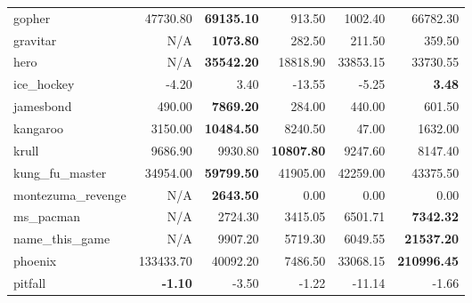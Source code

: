 \begin{center}
\begin{tabular}{l@{\hspace{.26cm}}r@{\hspace{.26cm}}r@{\hspace{.26cm}}r@{\hspace{.26cm}}r@{\hspace{.26cm}}r@{\hspace{.26cm}}}
        gopher             &         47730.80    & \textbf{69135.10}   &         913.50                    &         1002.40          &         66782.30      \\
        gravitar           &         N/A         & \textbf{1073.80}    &         282.50                    &         211.50           &         359.50        \\
        hero               &         N/A         & \textbf{35542.20}   &         18818.90                  &         33853.15         &         33730.55      \\
        ice\_hockey        &         -4.20       &         3.40        &         -13.55                    &         -5.25            & \textbf{3.48}         \\
        jamesbond          &         490.00      & \textbf{7869.20}    &         284.00                    &         440.00           &         601.50        \\
        kangaroo           &         3150.00     & \textbf{10484.50}   &         8240.50                   &         47.00            &         1632.00       \\
        krull              &         9686.90     &         9930.80     & \textbf{10807.80}                 &         9247.60          &         8147.40       \\
        kung\_fu\_master   &         34954.00    & \textbf{59799.50}   &         41905.00                  &         42259.00         &         43375.50      \\
        montezuma\_revenge &         N/A         & \textbf{2643.50}    &         0.00                      &         0.00             &         0.00          \\
        ms\_pacman         &         N/A         &         2724.30     &         3415.05                   &         6501.71          & \textbf{7342.32}      \\
        name\_this\_game   &         N/A         &         9907.20     &         5719.30                   &         6049.55          & \textbf{21537.20}     \\
        phoenix            &         133433.70   &         40092.20    &         7486.50                   &         33068.15         & \textbf{210996.45}    \\
        pitfall            & \textbf{-1.10}      &         -3.50       &         -1.22                     &         -11.14           &         -1.66         \\

\end{tabular}
\end{center}
